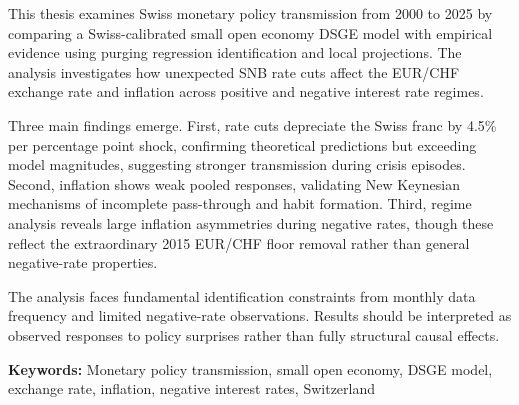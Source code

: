 \documentclass[12pt,a4paper]{article}
\begin{document}
This thesis examines Swiss monetary policy transmission from 2000 to 2025 by comparing a Swiss-calibrated small open economy DSGE model with empirical evidence using purging regression identification and local projections. The analysis investigates how unexpected SNB rate cuts affect the EUR/CHF exchange rate and inflation across positive and negative interest rate regimes.

Three main findings emerge. First, rate cuts depreciate the Swiss franc by 4.5\% per percentage point shock, confirming theoretical predictions but exceeding model magnitudes, suggesting stronger transmission during crisis episodes. Second, inflation shows weak pooled responses, validating New Keynesian mechanisms of incomplete pass-through and habit formation. Third, regime analysis reveals large inflation asymmetries during negative rates, though these reflect the extraordinary 2015 EUR/CHF floor removal rather than general negative-rate properties.

The analysis faces fundamental identification constraints from monthly data frequency and limited negative-rate observations. Results should be interpreted as observed responses to policy surprises rather than fully structural causal effects.

\vspace{0.5cm}
\noindent\textbf{Keywords:} Monetary policy transmission, small open economy, DSGE model, exchange rate, inflation, negative interest rates, Switzerland

\newpage

\tableofcontents
\newpage
\listoffigures
\listoftables
\endgroup	
\end{document}
